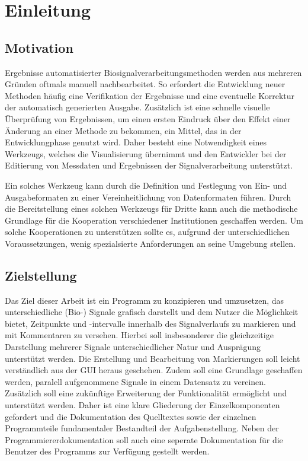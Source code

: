 \chapter{Einleitung}

\section{Motivation}

Ergebnisse automatisierter Biosignalverarbeitungsmethoden werden aus mehreren Gr\"unden oftmals manuell nachbearbeitet.
So erfordert die Entwicklung neuer Methoden h\"aufig eine Verifikation der Ergebnisse und eine eventuelle Korrektur der automatisch generierten Ausgabe.
Zus\"atzlich ist eine schnelle visuelle \"Uberpr\"ufung von Ergebnissen, um einen ersten Eindruck \"uber den Effekt einer \"Anderung an einer Methode zu bekommen, ein Mittel, das in der Entwicklungphase genutzt wird.
Daher besteht eine Notwendigkeit eines Werkzeugs, welches die Visualisierung \"ubernimmt und den Entwickler bei der Editierung von Messdaten und Ergebnissen der Signalverarbeitung unterst\"utzt.

Ein solches Werkzeug kann durch die Definition und Festlegung von Ein- und Ausgabeformaten zu einer Vereinheitlichung von Datenformaten f\"uhren.
Durch die Bereitstellung eines solchen Werkzeugs f\"ur Dritte kann auch die methodische Grundlage f\"ur die Kooperation verschiedener Institutionen geschaffen werden.
Um solche Kooperationen zu unterst\"utzen sollte es, aufgrund der unterschiedlichen Voraussetzungen, wenig spezialsierte Anforderungen an seine Umgebung stellen.

\section{Zielstellung}

Das Ziel dieser Arbeit ist ein Programm zu konzipieren und umzusetzen, das unterschiedliche (Bio-) Signale grafisch darstellt und dem Nutzer die M\"oglichkeit bietet, Zeitpunkte und -intervalle innerhalb des Signalverlaufs zu markieren und mit Kommentaren zu versehen.
Hierbei soll insbesonderer die gleichzeitige Darstellung mehrerer Signale unterschiedlicher Natur und Auspr\"agung unterst\"utzt werden.
Die Erstellung und Bearbeitung von Markierungen soll leicht verst\"andlich aus der \ac{GUI} heraus geschehen.
Zudem soll eine Grundlage geschaffen werden, paralell aufgenommene Signale in einem Datensatz zu vereinen.
Zus\"atzlich soll eine zuk\"unftige Erweiterung der Funktionalit\"at erm\"oglicht und unterst\"utzt werden.
Daher ist eine klare Gliederung der Einzelkomponenten gefordert und die Dokumentation des Quelltextes sowie der einzelnen Programmteile fundamentaler Bestandteil der Aufgabenstellung.
Neben der Programmiererdokumentation soll auch eine seperate Dokumentation f\"ur die Benutzer des Programms zur Verf\"ugung gestellt werden.

